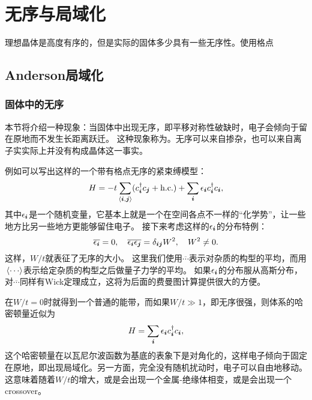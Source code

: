 \chapter{无序与局域化}

理想晶体是高度有序的，但是实际的固体多少具有一些无序性。使用格点

\section{Anderson局域化}\label{sec:anderson-localization}

\subsection{固体中的无序}

本节将介绍一种现象：当固体中出现无序，即平移对称性破缺时，电子会倾向于留在原地而不发生长距离跃迁。
这种现象称为。无序可以来自掺杂，也可以来自离子实实际上并没有构成晶体这一事实。

例如可以写出这样的一个带有格点无序的紧束缚模型：
\begin{equation}
    {H} = - t \sum_{\langle \vb*{i}, \vb*{j} \rangle} ({c}_{\vb*{i}}^\dagger {c}_{\vb*{j}} + \text{h.c.}) + \sum_{\vb*{i}} \epsilon_{\vb*{i}} {c}_{\vb*{i}}^\dagger {c}_{\vb*{i}},
    \label{eq:tight-binding-with-disorder}
\end{equation}
其中$\epsilon_{\vb*{i}}$是一个随机变量，它基本上就是一个在空间各点不一样的“化学势”，让一些地方比另一些地方更能够留住电子。
接下来考虑这样的$\epsilon_{\vb*{i}}$的分布特例：
\begin{equation}
    \overline{\epsilon_{\vb*{i}}} = 0, \quad \overline{\epsilon_{\vb*{i}} \epsilon_{\vb*{j}}} = \delta_{\vb*{i} \vb*{j}} W^2 , \quad W^2 \neq 0.
\end{equation}
这样，$W/t$就表征了无序的大小。
这里我们使用$\overline{\cdots}$表示对杂质的构型的平均，而用$\expval*{\cdots}$表示给定杂质的构型之后做量子力学的平均。
如果$\epsilon_{\vb*{i}}$的分布服从高斯分布，对$\overline{\cdots}$同样有Wick定理成立，这将为后面的费曼图计算提供很大的方便。

在$W/t=0$时就得到一个普通的能带，而如果$W/t \gg 1$，即无序很强，则体系的哈密顿量近似为
\[
    {H} = \sum_{\vb*{i}} \epsilon_{\vb*{i}} {c}_{\vb*{i}}^\dagger {c}_{\vb*{i}},
\]
这个哈密顿量在以瓦尼尔波函数为基底的表象下是对角化的，这样电子倾向于固定在原地，即出现局域化。另一方面，完全没有随机扰动时，电子可以自由地移动。
这意味着随着$W/t$的增大，或是会出现一个金属-绝缘体相变，或是会出现一个crossover。


